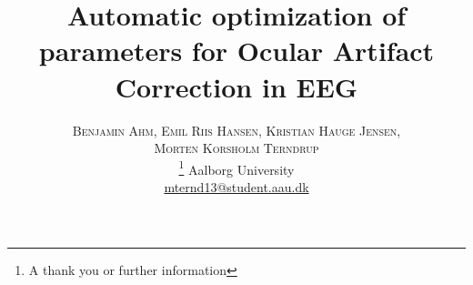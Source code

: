 \documentclass[twoside]{article}
\title{\vspace{-15mm}\fontsize{24pt}{10pt}\selectfont\textbf{Automatic optimization of parameters for Ocular Artifact Correction in EEG}} %
\author{
\large
\textsc{Benjamin Ahm, } %
\textsc{Emil Riis Hansen, }
\textsc{Kristian Hauge Jensen, }\\
\textsc{Morten Korsholm Terndrup}\\[2mm]\thanks{A thank you or further information}
\normalsize Aalborg University \\ %
\normalsize \href{mailto:mternd13@student.aau.dk}{mternd13@student.aau.dk} %
\vspace{-5mm}
}
\date{}
\begin{document}
\maketitle %

\thispagestyle{fancy} %





\begin{multicols}{2} %





















\end{multicols}
\end{document}
